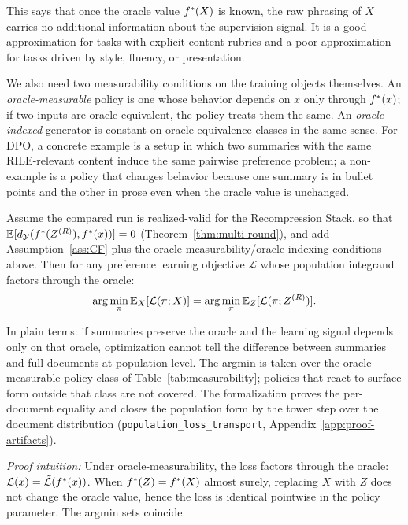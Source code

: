 This says that once the oracle value $f^\ast(X)$ is known, the raw phrasing of $X$ carries no additional information about the supervision signal. It is a good approximation for tasks with explicit content rubrics and a poor approximation for tasks driven by style, fluency, or presentation.

We also need two measurability conditions on the training objects themselves. An \emph{oracle-measurable} policy is one whose behavior depends on $x$ only through $f^\ast(x)$; if two inputs are oracle-equivalent, the policy treats them the same. An \emph{oracle-indexed} generator is constant on oracle-equivalence classes in the same sense. For DPO, a concrete example is a setup in which two summaries with the same RILE-relevant content induce the same pairwise preference problem; a non-example is a policy that changes behavior because one summary is in bullet points and the other in prose even when the oracle value is unchanged.

\begin{theorem}\label{thm:pref-equiv}
Assume the compared run is realized-valid for the Recompression Stack, so that $\mathbb{E}[d_{\mathcal{Y}}(f^\ast(Z^{(R)}), f^\ast(x))] = 0$ (Theorem~\ref{thm:multi-round}), and add Assumption~\ref{ass:CF} plus the oracle-measurability/oracle-indexing conditions above. Then for any preference learning objective $\mathcal{L}$ whose population integrand factors through the oracle:
\[
\arg\min_\pi \mathbb{E}_X[\mathcal{L}(\pi; X)] = \arg\min_\pi \mathbb{E}_Z[\mathcal{L}(\pi; Z^{(R)})].
\]
\end{theorem}

\noindent In plain terms: if summaries preserve the oracle and the learning signal depends only on that oracle, optimization cannot tell the difference between summaries and full documents at population level. The argmin is taken over the oracle-measurable policy class of Table~\ref{tab:measurability}; policies that react to surface form outside that class are not covered. The formalization proves the per-document equality and closes the population form by the tower step over the document distribution (\texttt{population\_loss\_transport}, Appendix~\ref{app:proof-artifacts}).

\noindent\textit{Proof intuition:} Under oracle-measurability, the loss factors through the oracle: $\mathcal{L}(x) = \tilde{\mathcal{L}}(f^\ast(x))$. When $f^\ast(Z) = f^\ast(X)$ almost surely, replacing $X$ with $Z$ does not change the oracle value, hence the loss is identical pointwise in the policy parameter. The argmin sets coincide.

